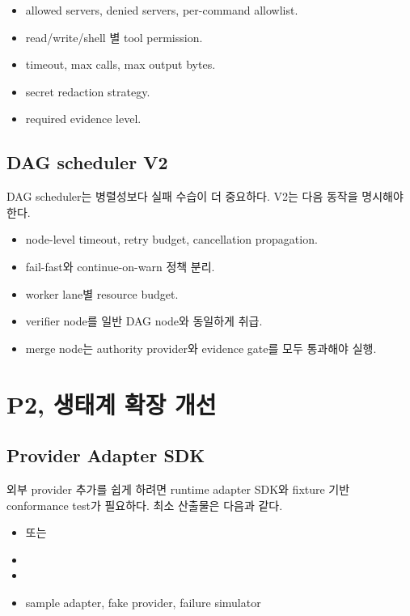 \documentclass[11pt,a4paper]{article}
\begin{document}
\begin{itemize}
  \item allowed servers, denied servers, per-command allowlist.
  \item read/write/shell 별 tool permission.
  \item timeout, max calls, max output bytes.
  \item secret redaction strategy.
  \item required evidence level.
\end{itemize}

\subsection{DAG scheduler V2}
DAG scheduler는 병렬성보다 실패 수습이 더 중요하다. V2는 다음 동작을 명시해야 한다.

\begin{itemize}
  \item node-level timeout, retry budget, cancellation propagation.
  \item fail-fast와 continue-on-warn 정책 분리.
  \item worker lane별 resource budget.
  \item verifier node를 일반 DAG node와 동일하게 취급.
  \item merge node는 authority provider와 evidence gate를 모두 통과해야 실행.
\end{itemize}

\section{P2, 생태계 확장 개선}
\subsection{Provider Adapter SDK}
외부 provider 추가를 쉽게 하려면 runtime adapter SDK와 fixture 기반 conformance test가 필요하다. 최소 산출물은 다음과 같다.

\begin{itemize}
  \item {} 또는 
  \item {}
  \item {}
  \item sample adapter, fake provider, failure simulator
\end{itemize}
\end{document}
